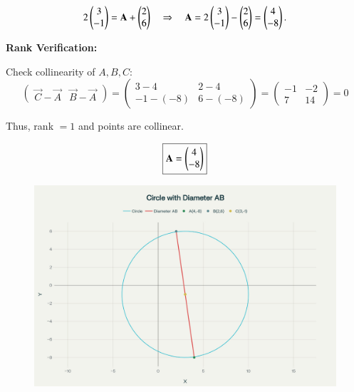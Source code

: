 \documentclass[journal]{IEEEtran}
\begin{document}
\[
2\begin{pmatrix}3\\-1\end{pmatrix}=\mathbf A+\begin{pmatrix}2\\6\end{pmatrix}
\quad\Rightarrow\quad
\mathbf A=2\begin{pmatrix}3\\-1\end{pmatrix}-\begin{pmatrix}2\\6\end{pmatrix}=\begin{pmatrix}4\\-8\end{pmatrix}.
\]

\bigskip

\textbf{Rank Verification:}

Check collinearity of \(A,B,C\):
\[
\begin{pmatrix}\vec C-\vec A & \vec B-\vec A\end{pmatrix}
=\begin{pmatrix}3-4 & 2-4\\ -1-(-8) & 6-(-8)\end{pmatrix}
=\begin{pmatrix}-1 & -2\\ 7 & 14\end{pmatrix} = 0
\]


Thus, rank \(=1\) and points are collinear.

\[
\boxed{\mathbf A=\begin{pmatrix}4\\-8\end{pmatrix}}
\]

\begin{figure}[H]
    \centering
    \includegraphics[width=0.5\linewidth]{figs/fig.png}
    \caption{}
    \label{fig:placeholder}
\end{figure}
\end{document}
